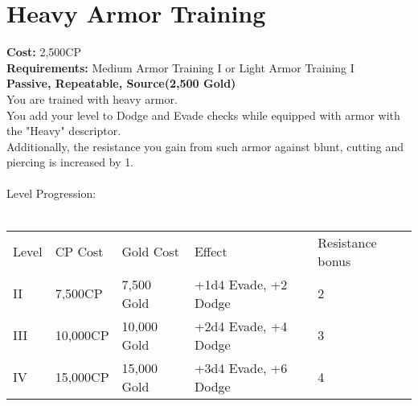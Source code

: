 \section{Heavy Armor Training}\label{perk:heavyArmorTraining}
\textbf{Cost:} 2,500CP\\
\textbf{Requirements:} Medium Armor Training I or Light Armor Training I\\
\textbf{Passive, Repeatable, Source(2,500 Gold)}\\
You are trained with heavy armor.\\
You add your level to Dodge and Evade checks while equipped with armor with the "Heavy" descriptor.\\
Additionally, the resistance you gain from such armor against blunt, cutting and piercing is increased by 1.\\
\\

Level Progression:\\
\\
\begin{tabular}{l | l | l | l | l}
    Level & CP Cost & Gold Cost & Effect & Resistance bonus \\
    II
    & 7,500CP
    & 7,500 Gold
    & +1d4 Evade, +2 Dodge
    & 2
    \\
    III
    & 10,000CP
    & 10,000 Gold
    & +2d4 Evade, +4 Dodge
    & 3
    \\
    IV
    & 15,000CP
    & 15,000 Gold
    & +3d4 Evade, +6 Dodge
    & 4
    \\
\end{tabular}